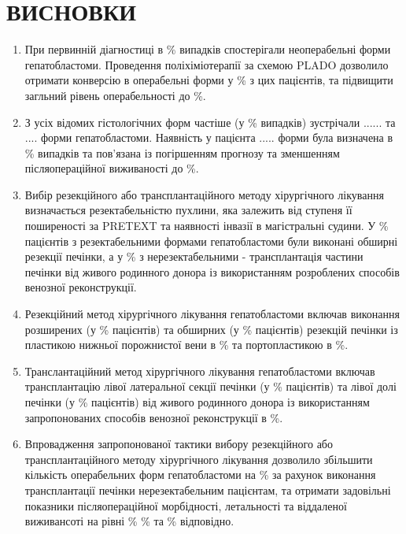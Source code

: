 \chapter{ВИСНОВКИ}
\begin{enumerate}
    \item При первинній діагностиці в \% випадків спостерігали неоперабельні форми гепатобластоми. Проведення поліхіміотерапії за схемою PLADO дозволило отримати конверсію в операбельні форми у \% з цих пацієнтів, та підвищити загльний рівень операбельності до  \%.
    
    \item З усіх відомих гістологічних форм частіше (у \% випадків) зустрічали ...... та .... форми гепатобластоми. Наявність у пацієнта ..... форми була визначена в \% випадків та пов'язана із погіршенням прогнозу та зменшенням післяопераційної виживаності до \%.
    
    \item Вибір резекційного або трансплантаційного методу хірургічного лікування визначається резектабельністю пухлини, яка залежить від ступеня її поширеності за PRETEXT та наявності інвазії в магістральні судини. У \% пацієнтів з резектабельними формами гепатобластоми були виконані обширні резекції печінки, а у \% з нерезектабельними - трансплантація частини печінки від живого родинного донора із використанням розроблених способів венозної реконструкції.
    
    \item Резекційний метод хірургічного лікування гепатобластоми включав виконання розширених (у \% пацієнтів) та обширних (у \% пацієнтів) резекцій печінки із пластикою нижньої порожнистої вени в \% та портопластикою в \%.
    
    \item Транслантаційний метод хірургічного лікування гепатобластоми включав трансплантацію лівої латеральної секції печінки (у \% пацієнтів) та лівої долі печінки (у \% пацієнтів) від живого родинного донора із використанням запропонованих способів венозної реконструкції в \%.
    
    \item Впровадження запропонованої тактики вибору резекційного або трансплантаційного методу хірургічного лікування дозволило збільшити кількість операбельних форм гепатобластоми на  \% за рахунок виконання трансплантації печінки нерезектабельним пацієнтам, та отримати задовільні показники післяопераційної морбідності, летальності та віддаленої виживансоті на рівні   \% \% та \% відповідно.
    
\end{enumerate}